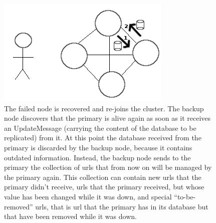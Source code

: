 \documentclass{article}
\begin{document}
\begin{figure}[H]
\centering
\includegraphics[scale=0.45]{conflict3}
\caption{The failed node is recovered and re-joins the cluster. The backup node discovers that the primary is alive again as soon as it receives an UpdateMessage (carrying the content of the database to be replicated) from it. At this point the database received from the primary is discarded by the backup node, because it contains outdated information. Instead, the backup node sends to the primary the collection of urls that from now on will be managed by the primary again. This collection can contain new urls that the primary didn't receive, urls that the primary received, but whose value has been changed while it was down, and special ``to-be-removed'' urls, that is url that the primary has in its database but that have been removed while it was down.  }
\label{fig:conflict3}
\end{figure}
\end{document}
